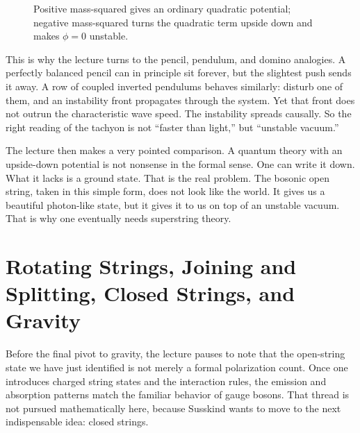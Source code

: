 \begin{figure}[t]
\centering
{}
\caption{Positive mass-squared gives an ordinary quadratic potential; negative mass-squared turns the quadratic term upside down and makes \(\phi=0\) unstable.}
\end{figure}

This is why the lecture turns to the pencil, pendulum, and domino analogies. A perfectly balanced pencil can in principle sit forever, but the slightest push sends it away. A row of coupled inverted pendulums behaves similarly: disturb one of them, and an instability front propagates through the system. Yet that front does not outrun the characteristic wave speed. The instability spreads causally. So the right reading of the tachyon is not ``faster than light,'' but ``unstable vacuum.''

The lecture then makes a very pointed comparison. A quantum theory with an upside-down potential is not nonsense in the formal sense. One can write it down. What it lacks is a ground state. That is the real problem. The bosonic open string, taken in this simple form, does not look like the world. It gives us a beautiful photon-like state, but it gives it to us on top of an unstable vacuum. That is why one eventually needs superstring theory.

\section{Rotating Strings, Joining and Splitting, Closed Strings, and Gravity}

Before the final pivot to gravity, the lecture pauses to note that the open-string state we have just identified is not merely a formal polarization count. Once one introduces charged string states and the interaction rules, the emission and absorption patterns match the familiar behavior of gauge bosons. That thread is not pursued mathematically here, because Susskind wants to move to the next indispensable idea: closed strings.

